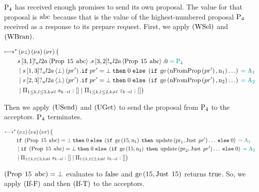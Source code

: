 $\Proposer{4}$ has received enough promises to send its own proposal.
The value for that proposal is $\ABC$ because that is the value of the highest-numbered proposal $\Proposer{4}$ received as a response to its prepare request.
First, we apply $\RWsel$ and $\RWbran$.

\begin{align*}
\mapstostar& \NuChannels \big (\\
&
    \SendUnreliableP{\ChannelS}{3}{1}{\LTwoA}{\ProposalC{15}{\ABC}}.
    \SendUnreliableP{\ChannelS}{3}{2}{\LTwoA}{\ProposalC{15}{\ABC}}.
    \End
    \comment{= \Proposer{4}}\\
&\Or
    \ReceiveUnreliableP{\ChannelS}{1}{3}{\LTwoA}{\bot}{pr'}.
    \mIf pr' = \bot
    \;\mThen \End
    \;\mElse \Paren{
        \mIf \greaterEqual{\nFromProposal{pr'}}{\NumberRegister_1}
        \ldots
    }
    \comment{= \Acceptor{1}}\\
&\Or
    \ReceiveUnreliableP{\ChannelS}{2}{3}{\LTwoA}{\bot}{pr'}.
    \mIf pr' = \bot
    \;\mThen \End
    \;\mElse \Paren{
        \mIf \greaterEqual{\nFromProposal{pr'}}{\NumberRegister_2}
        \ldots
    }
    \comment{= \Acceptor{2}}\\
&\Or \InnerSessionQueues{\ChannelS}
\Or \OuterSessionQueues
\big )
\end{align*}

Then we apply $\RUsend$ and $\RUget$ to send the proposal from $\Proposer{4}$ to the acceptors.
$\Proposer{4}$ terminates.

\begin{align*}
\mapstostar& \NuChannels \big (\\
&
    \mIf \Paren{\ProposalC{15}{\ABC}} = \bot
    \;\mThen \End
    \;\mElse \Paren{
        \mIf \greaterEqual{15}{\NumberRegister_1}
        \;\mThen \update{\ProposalRegister_1}{\Just{pr'}}\ldots
        \;\mElse \End
    }
    \comment{= \Acceptor{1}}\\
&\Or
    \mIf \Paren{\ProposalC{15}{\ABC}} = \bot
    \;\mThen \End
    \;\mElse \Paren{
        \mIf \greaterEqual{15}{\NumberRegister_2}
        \;\mThen \update{\ProposalRegister_2}{\Just{pr'}}\ldots
        \;\mElse \End
    }
    \comment{= \Acceptor{2}}\\
&\Or \InnerSessionQueues{\ChannelS}
\Or \OuterSessionQueues
\big )
\end{align*}

$\Paren{\ProposalC{15}{\ABC}} = \bot$ evaluates to $\False$ and $\greaterEqual{15}{\Just{15}}$ returns $\True$.
So, we apply $\RIfF$ and then $\RIfT$ to the acceptors.

